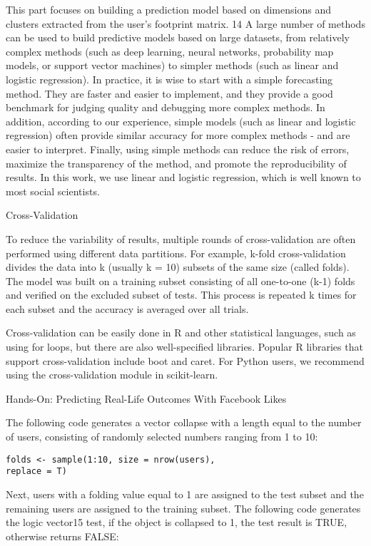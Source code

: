 This part focuses on building a prediction model based on 
dimensions and clusters extracted from the user's footprint matrix.
 14 A large number of methods can be used to build predictive 
models based on large datasets, from relatively complex methods 
(such as deep learning, neural networks, probability map models, or
 support vector machines) to simpler methods (such as linear and 
logistic regression). In practice, it is wise to start with a 
simple forecasting method. They are faster and easier to implement,
 and they provide a good benchmark for judging quality and 
debugging more complex methods. In addition, according to our 
experience, simple models (such as linear and logistic regression)
 often provide similar accuracy for more complex methods - and are
 easier to interpret. Finally, using simple methods can reduce the
 risk of errors, maximize the transparency of the method, and 
promote the reproducibility of results. In this work, we use linear
 and logistic regression, which is well known to most social 
scientists.

Cross-Validation

To reduce the variability of results, multiple rounds of 
cross-validation are often performed using different data 
partitions. For example, k-fold cross-validation divides the data 
into k (usually k = 10) subsets of the same size (called folds). 
The model was built on a training subset consisting of all 
one-to-one (k-1) folds and verified on the excluded subset of 
tests. This process is repeated k times for each subset and the 
accuracy is averaged over all trials.

Cross-validation can be easily done in R and other statistical 
languages, such as using for loops, but there are also 
well-specified libraries. Popular R libraries that support 
cross-validation include boot and caret. For Python users, we 
recommend using the cross-validation module in scikit-learn.

Hands-On: Predicting Real-Life Outcomes With
Facebook Likes

The following code generates a vector collapse with a length equal
 to the number of users, consisting of randomly selected numbers 
ranging from 1 to 10:

\begin{verbatim}
folds <- sample(1:10, size = nrow(users),
replace = T)
\end{verbatim}

Next, users with a folding value equal to 1 are assigned to the 
test subset and the remaining users are assigned to the training 
subset. The following code generates the logic vector15 test, if 
the object is collapsed to 1, the test result is TRUE, otherwise 
returns FALSE:

